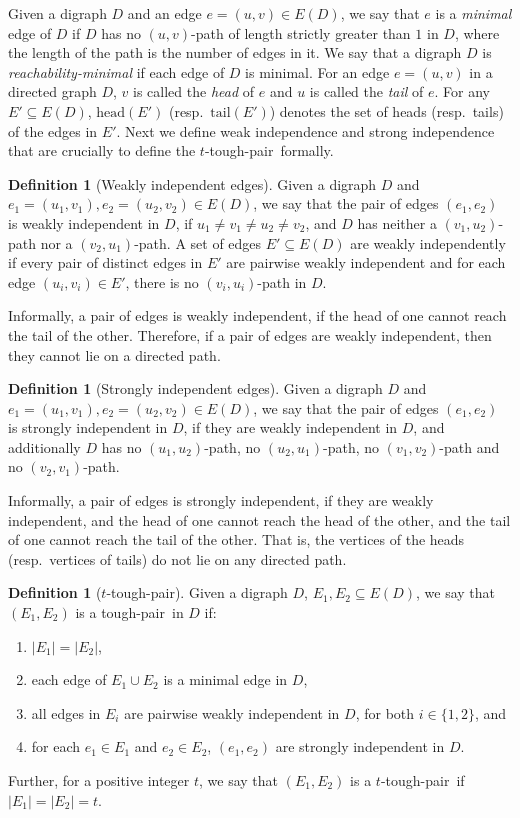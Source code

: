 \documentclass[a4paper,11pt]{article}
\theoremstyle{plain}
\newtheorem{identification rule}{Identification Rule}
\theoremstyle{definition}
\newtheorem{definition}[theorem]{Definition}
\theoremstyle{remark}
\newcommand{\toughpair}{tough-pair}
\newcommand{\head}{\text{head}}
\newcommand{\tail}{\text{tail}}
\begin{document}
Given a digraph $D$ and an edge $e=(u,v) \in E(D)$, we say that $e$ is a {\em minimal} edge of $D$ if $D$ has no $(u,v)$-path of length strictly greater than $1$ in $D$, where the length of the path is the number of edges in it.
We say that a digraph $D$ is {\em reachability-minimal} if each edge of $D$ is minimal.
For an edge $e=(u,v)$ in a directed graph $D$, $v$ is called the {\em head} of $e$ and $u$ is called the {\em tail} of $e$. 
For any $E' \subseteq E(D)$, 
$\head(E')$ (resp.~$\tail(E')$) denotes the set of heads (resp.~tails) of the edges in $E'$.
Next we define weak independence and strong independence that are crucially to define the $t$-\toughpair\ formally.

\begin{definition}[Weakly independent edges]
Given a digraph $D$ and $e_1 = (u_1,v_1), e_2 =(u_2,v_2) \in E(D)$, 
we say that the pair of edges $(e_1,e_2)$ is weakly independent in $D$, 
if $u_1 \neq v_1 \neq u_2 \neq v_2$,  and
$D$ has neither a $(v_1,u_2)$-path nor a $(v_2,u_1)$-path. 
A set of edges $E' \subseteq E(D)$ are weakly independently if every pair of distinct edges in $E'$ are pairwise weakly independent and for each edge $(u_i,v_i) \in E'$, there is no $(v_i,u_i)$-path in $D$.

Informally, a pair of edges is weakly independent, if the head of one cannot reach the tail of the other. Therefore, if a pair of edges are weakly independent, then they cannot lie on a directed path.
\end{definition}


\begin{definition}[Strongly independent edges]
Given a digraph $D$ and $e_1 = (u_1,v_1), e_2 =(u_2,v_2) \in E(D)$, we say that the pair of edges $(e_1,e_2)$ is strongly independent in $D$, if they are weakly independent in $D$, and additionally $D$ has no $(u_1,u_2)$-path, no $(u_2,u_1)$-path, no $(v_1,v_2)$-path and no $(v_2,v_1)$-path. 

Informally, a pair of edges is strongly independent, if they are weakly independent, and the head of one cannot reach the head of the other, and the tail of one cannot reach the tail of the other. That is, the vertices of the heads (resp.~vertices of tails) do not lie on any directed path.
\end{definition}

\begin{definition}[$t$-\toughpair]\label{def:ttough}
Given a digraph $D$, $E_1, E_2 \subseteq E(D)$, we say that $(E_1,E_2)$ is a \toughpair\  in $D$ if:
\begin{enumerate}
\item $|E_1| = |E_2|$,
\item each edge of $E_1 \cup E_2$ is a minimal edge in $D$,
\item all edges in $E_i$ are pairwise weakly independent in $D$, for both $i \in \{1,2\}$, and
\item for each $e_1 \in E_1$ and $e_2 \in E_2$, $(e_1,e_2)$ are strongly independent in $D$.
\end{enumerate}

Further, for a positive integer $t$, we say that $(E_1,E_2)$ is a $t$-\toughpair\ if $|E_1| = |E_2| =t$.
\end{definition}
\end{document}
